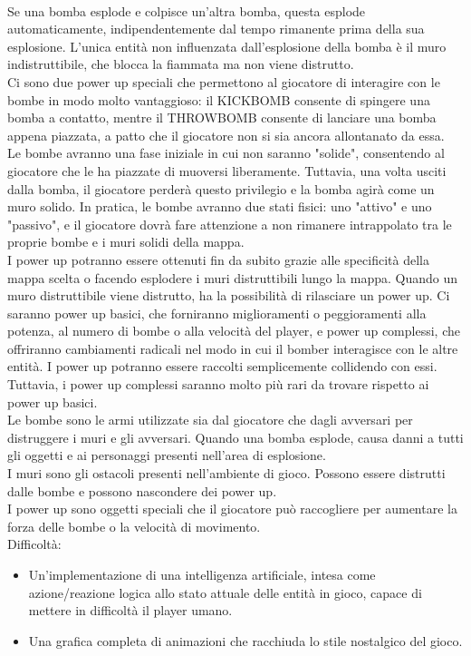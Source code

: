 \documentclass[a4paper,12pt]{report}
\begin{document}
\\
Se una bomba esplode e colpisce un'altra bomba, questa esplode automaticamente, indipendentemente dal tempo rimanente prima della sua esplosione. L'unica entità non influenzata dall'esplosione della bomba è il muro indistruttibile, che blocca la fiammata ma non viene distrutto.
\\
Ci sono due power up speciali che permettono al giocatore di interagire con le bombe in modo molto vantaggioso: il KICKBOMB consente di spingere una bomba a contatto, mentre il THROWBOMB consente di lanciare una bomba appena piazzata, a patto che il giocatore non si sia ancora allontanato da essa.
\\
Le bombe avranno una fase iniziale in cui non saranno "solide", consentendo al giocatore che le ha piazzate di muoversi liberamente. Tuttavia, una volta usciti dalla bomba, il giocatore perderà questo privilegio e la bomba agirà come un muro solido. In pratica, le bombe avranno due stati fisici: uno "attivo" e uno "passivo", e il giocatore dovrà fare attenzione a non rimanere intrappolato tra le proprie bombe e i muri solidi della mappa.
\\
I power up potranno essere ottenuti fin da subito grazie alle specificità della mappa scelta o facendo esplodere i muri distruttibili lungo la mappa. Quando un muro distruttibile viene distrutto, ha la possibilità di rilasciare un power up. Ci saranno power up basici, che forniranno miglioramenti o peggioramenti alla potenza, al numero di bombe o alla velocità del player, e power up complessi, che offriranno cambiamenti radicali nel modo in cui il bomber interagisce con le altre entità. I power up potranno essere raccolti semplicemente collidendo con essi. Tuttavia, i power up complessi saranno molto più rari da trovare rispetto ai power up basici.
\\
Le bombe sono le armi utilizzate sia dal giocatore che dagli avversari per distruggere i muri e gli avversari. Quando una bomba esplode, causa danni a tutti gli oggetti e ai personaggi presenti nell'area di esplosione.
\\
I muri sono gli ostacoli presenti nell'ambiente di gioco. Possono essere distrutti dalle bombe e possono nascondere dei power up.
\\
I power up sono oggetti speciali che il giocatore può raccogliere per aumentare la forza delle bombe o la velocità di movimento.
\\
Difficoltà:
\begin{itemize}
    \item Un’implementazione di una intelligenza artificiale, intesa come azione/reazione logica allo stato attuale delle entità in gioco, capace di mettere in difficoltà il player umano.
    \item Una grafica completa di animazioni che racchiuda lo stile nostalgico del gioco.
\end{itemize}
\end{document}
